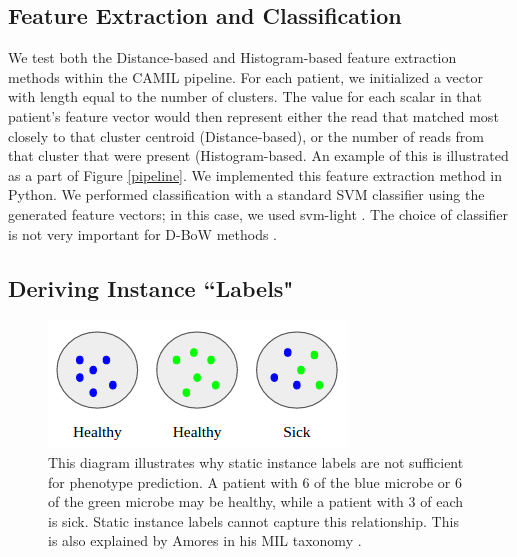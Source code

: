 \subsection{Feature Extraction and Classification}

We test both the Distance-based and Histogram-based feature extraction methods within the CAMIL pipeline. For each patient, we initialized a vector with length equal to the number of clusters. The value for each scalar in that patient's feature vector would then represent either the read that matched most closely to that cluster centroid (Distance-based), or the number of reads from that cluster that were present (Histogram-based. An example of this is illustrated as a part of Figure \ref{pipeline}. We implemented this feature extraction method in Python. We performed classification with a standard SVM classifier using the generated feature vectors; in this case, we used svm-light \cite{joachims08}. The choice of classifier is not very important for D-BoW methods \cite{amores13}.

\subsection{Deriving Instance ``Labels"}

\begin{figure}[t]
\centering
\includegraphics[scale=0.5]{./instance-labels.png}
\caption{This diagram illustrates why static instance labels are not sufficient for phenotype prediction. A patient with 6 of the blue microbe or 6 of the green microbe may be healthy, while a patient with 3 of each is sick. Static instance labels cannot capture this relationship. This is also explained by Amores in his MIL taxonomy \cite{amores13}.} \label{instance-labels}
\end{figure}

